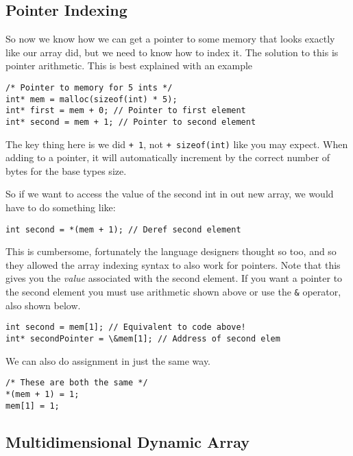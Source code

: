 \subsection{Pointer Indexing}

So now we know how we can get a pointer to some memory that looks exactly like our array did, but we need to know how to index it.
The solution to this is pointer arithmetic.
This is best explained with an example

\begin{lstlisting}
/* Pointer to memory for 5 ints */
int* mem = malloc(sizeof(int) * 5); 
int* first = mem + 0; // Pointer to first element 
int* second = mem + 1; // Pointer to second element
\end{lstlisting}

The key thing here is we did \texttt{+ 1}, not \texttt{+ sizeof(int)} like you may expect.
When adding to a pointer, it will automatically increment by the correct number of bytes for the base types size.

So if we want to access the value of the second int in out new array, we would have to do something like:

\begin{lstlisting}[numbers=none,frame=none]
int second = *(mem + 1); // Deref second element
\end{lstlisting}

This is cumbersome, fortunately the language designers thought so too, and so they allowed the array indexing syntax to also work for pointers.
Note that this gives you the \emph{value} associated with the second element.
If you want a pointer to the second element you must use arithmetic shown above or use the \texttt{\&} operator, also shown below.

\begin{lstlisting}[numbers=none,frame=none]
int second = mem[1]; // Equivalent to code above!
int* secondPointer = \&mem[1]; // Address of second elem
\end{lstlisting}

We can also do assignment in just the same way.

\begin{lstlisting}
/* These are both the same */
*(mem + 1) = 1;
mem[1] = 1; 
\end{lstlisting}

\subsection{Multidimensional Dynamic Array}

